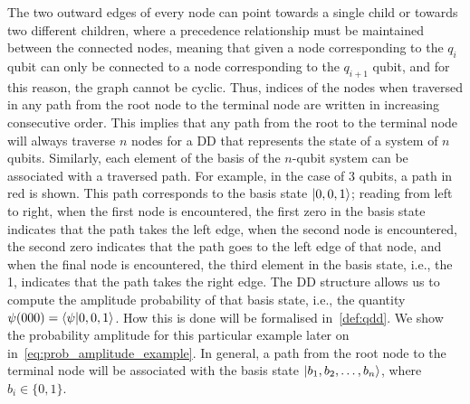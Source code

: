 \documentclass{ieeeaccess}
\begin{document}
The two outward edges of every node can point towards a single child or towards two different children, where a precedence relationship must be maintained between the connected nodes, meaning that given a node corresponding to the $q_i$ qubit can only be connected to a node corresponding to the $q_{i+1}$ qubit, and for this reason, the graph cannot be cyclic.
Thus, indices of the nodes when traversed in any path from the root node to the terminal node are written in increasing consecutive order.
This implies that any path from the root to the terminal node will always traverse $n$ nodes for a DD that represents the state of a system of $n$ qubits.
Similarly, each element of the basis of the $n$-qubit system can be associated with a traversed path.
For example, in the case of 3 qubits, a path in red is shown.
This path corresponds to the basis state $\ket{0,0,1}$; reading from left to right, when the first node is encountered, the first zero in the basis state indicates that the path takes the left edge, when the second node is encountered, the second zero indicates that the path goes to the left edge of that node, and when the final node is encountered, the third element in the basis state, i.e., the 1, indicates that the path takes the right edge.
The DD structure allows us to compute the amplitude probability of that basis state, i.e., the quantity $\psi(000) = \braket{\psi}{0,0,1}$.
How this is done will be formalised in~\cref{def:qdd}.
We show the probability amplitude for this particular example later on in~\eqref{eq:prob_amplitude_example}.
In general, a path from the root node to the terminal node will be associated with the basis state $\ket{b_1,b_2,\ldots,b_n}$, where $b_i\in\{0, 1\}$.
\end{document}
